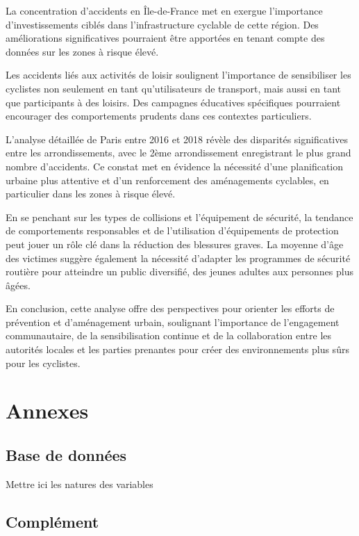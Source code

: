 \documentclass[french,]{compterendu}
\theoremstyle{urcastyle}
\theoremstyle{remark}
\begin{document}
La concentration d'accidents en Île-de-France met en exergue l'importance d'investissements ciblés dans l'infrastructure cyclable de cette région. Des améliorations significatives pourraient être apportées en tenant compte des données sur les zones à risque élevé.

Les accidents liés aux activités de loisir soulignent l'importance de sensibiliser les cyclistes non seulement en tant qu'utilisateurs de transport, mais aussi en tant que participants à des loisirs. Des campagnes éducatives spécifiques pourraient encourager des comportements prudents dans ces contextes particuliers.

L'analyse détaillée de Paris entre 2016 et 2018 révèle des disparités significatives entre les arrondissements, avec le 2ème arrondissement enregistrant le plus grand nombre d'accidents. Ce constat met en évidence la nécessité d'une planification urbaine plus attentive et d'un renforcement des aménagements cyclables, en particulier dans les zones à risque élevé.

En se penchant sur les types de collisions et l'équipement de sécurité, la tendance de comportements responsables et de l'utilisation d'équipements de protection peut jouer un rôle clé dans la réduction des blessures graves. La moyenne d'âge des victimes suggère également la nécessité d'adapter les programmes de sécurité routière pour atteindre un public diversifié, des jeunes adultes aux personnes plus âgées.

En conclusion, cette analyse offre des perspectives pour orienter les efforts de prévention et d'aménagement urbain, soulignant l'importance de l'engagement communautaire, de la sensibilisation continue et de la collaboration entre les autorités locales et les parties prenantes pour créer des environnements plus sûrs pour les cyclistes.

\hypertarget{annexes}{%
\section{Annexes}\label{annexes}}

\hypertarget{base-de-donnuxe9es}{%
\subsection{Base de données}\label{base-de-donnuxe9es}}

Mettre ici les natures des variables

\hypertarget{compluxe9ment}{%
\subsection{Complément}\label{compluxe9ment}}
\end{document}
